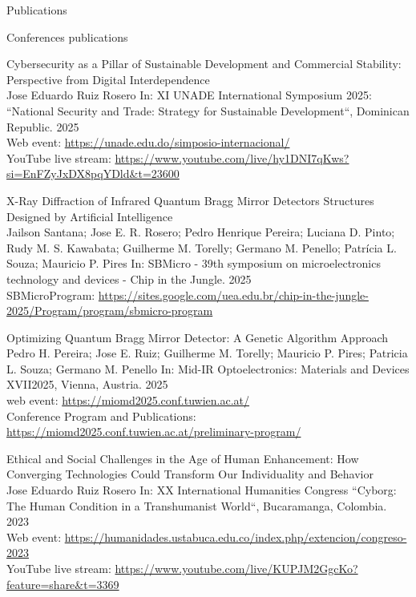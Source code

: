 \documentclass{resume} %
\begin{document}
\begin{rSection}{Publications}
        \begin{rSubsection}{Conferences publications}{}{}{}
            \item Cybersecurity as a Pillar of Sustainable Development and Commercial Stability: Perspective from Digital Interdependence \\ {\normalfont Jose Eduardo Ruiz Rosero} In: {\normalfont XI UNADE International Symposium 2025: ``National Security and Trade: Strategy for Sustainable Development``, Dominican Republic. 2025} \\ Web event: {\normalfont \url{https://unade.edu.do/simposio-internacional/}} \\ YouTube live stream: {\normalfont \url{https://www.youtube.com/live/hy1DNI7qKws?si=EnFZyJxDX8pqYDld&t=23600}} %
            \item X-Ray Diffraction of Infrared Quantum Bragg Mirror Detectors Structures Designed by Artificial Intelligence \\ {\normalfont Jailson Santana; Jose E. R. Rosero; Pedro Henrique Pereira; Luciana D. Pinto; Rudy M. S. Kawabata; Guilherme M. Torelly; Germano M. Penello; Patrícia L. Souza; Mauricio P. Pires} In:  {\normalfont SBMicro - 39th symposium on microelectronics technology and devices - Chip in the Jungle. 2025} \\ SBMicroProgram: {\normalfont  \url{https://sites.google.com/uea.edu.br/chip-in-the-jungle-2025/Program/program/sbmicro-program}} %
            \item Optimizing Quantum Bragg Mirror Detector: A Genetic Algorithm Approach \\ {\normalfont Pedro H. Pereira; Jose E. Ruiz; Guilherme M. Torelly; Mauricio P. Pires; Patricia L. Souza; Germano M. Penello} In:  {\normalfont Mid-IR Optoelectronics: Materials and Devices XVII2025, Vienna, Austria. 2025} \\ web event: {\normalfont  \url{https://miomd2025.conf.tuwien.ac.at/}} \\ Conference Program and Publications: {\normalfont  \url{https://miomd2025.conf.tuwien.ac.at/preliminary-program/}} %
            \item Ethical and Social Challenges in the Age of Human Enhancement: How Converging Technologies Could Transform Our Individuality and Behavior \\ {\normalfont Jose Eduardo Ruiz Rosero} In: {\normalfont XX International Humanities Congress ``Cyborg: The Human Condition in a Transhumanist World``, Bucaramanga, Colombia. 2023} \\ Web event: {\normalfont \url{https://humanidades.ustabuca.edu.co/index.php/extencion/congreso-2023}} \\ YouTube live stream: {\normalfont \url{https://www.youtube.com/live/KUPJM2GgcKo?feature=share&t=3369}} %

\end{rSubsection}
\end{rSection}
\end{document}
